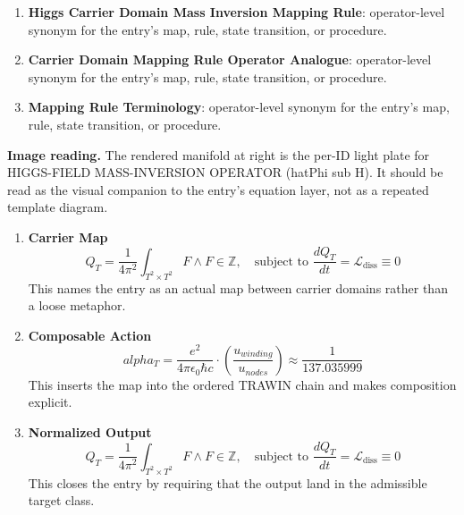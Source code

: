 \begin{enumerate}[leftmargin=1.6em,itemsep=6pt,topsep=4pt]
\item \textbf{Higgs Carrier Domain Mass Inversion Mapping Rule}: operator-level synonym for the entry's map, rule, state transition, or procedure.
\item \textbf{Carrier Domain Mapping Rule Operator Analogue}: operator-level synonym for the entry's map, rule, state transition, or procedure.
\item \textbf{Mapping Rule Terminology}: operator-level synonym for the entry's map, rule, state transition, or procedure.
\end{enumerate}

\begin{samepage}
\noindent\begin{minipage}[t]{0.45\linewidth}
\vspace{0pt}
\raggedright
\scriptsize\textbf{Image reading.} The rendered manifold at right is the per-ID light plate for HIGGS-FIELD MASS-INVERSION OPERATOR (hatPhi sub H). It should be read as the visual companion to the entry's equation layer, not as a repeated template diagram.\par
\end{minipage}\hfill
\begin{minipage}[t]{0.53\linewidth}
\vspace*{-0.10in}
\raggedright
{}
\end{minipage}
\end{samepage}

\clearpage


\begin{enumerate}[leftmargin=1.6em,itemsep=9pt,topsep=6pt]
\item \textbf{Carrier Map}
\[
Q_T = \frac{1}{4\pi^2} \int_{T^2 \times T^2} F \wedge F \in \mathbb{Z}, \quad \text{subject to } \frac{dQ_T}{dt} = \mathcal{L}_{\text{diss}} \equiv 0
\]
This names the entry as an actual map between carrier domains rather than a loose metaphor.

\item \textbf{Composable Action}
\[
alpha_T = \frac{e^2}{4\pi\epsilon_0 \hbar c} \cdot \left( \frac{ u_{winding}}{ u_{nodes}} \right) \approx \frac{1}{137.035999}
\]
This inserts the map into the ordered TRAWIN chain and makes composition explicit.

\item \textbf{Normalized Output}
\[
Q_T = \frac{1}{4\pi^2} \int_{T^2 \times T^2} F \wedge F \in \mathbb{Z}, \quad \text{subject to } \frac{dQ_T}{dt} = \mathcal{L}_{\text{diss}} \equiv 0
\]
This closes the entry by requiring that the output land in the admissible target class.
\end{enumerate}

